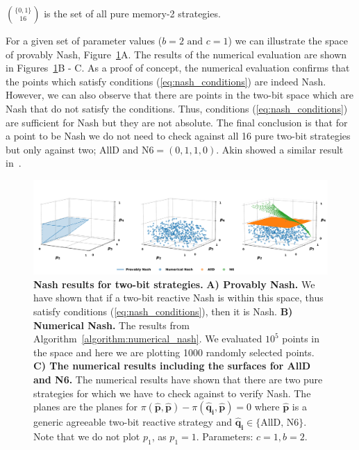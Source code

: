 \documentclass{article}
\theoremstyle{definition}
\begin{document}
\(\binom{\{0, 1\}}{16}\) is the set of all pure memory-2 strategies.

For a given set of parameter values (\(b=2 \text{ and } c=1\)) we can illustrate
the space of provably Nash, Figure~\ref{fig:two_bit_reactive_nash_results}A. The
results of the numerical evaluation are shown in
Figures~\ref{fig:two_bit_reactive_nash_results}B - C. As a proof of concept, the
numerical evaluation confirms that the points which satisfy conditions
(\ref{eq:nash_conditions}) are indeed Nash. However, we can also observe
that there are points in the two-bit space which are Nash that do not satisfy
the conditions. Thus, conditions (\ref{eq:nash_conditions}) are sufficient for
Nash but they are not absolute. The final conclusion is that for a point to be Nash
we do not need to check against all 16 pure two-bit strategies but only against
two; AllD and N6\(=(0, 1, 1, 0)\). Akin showed a similar result
in~\citep{akin:EGADS:2016}.


\begin{figure}[!htbp]
     \centering
     \includegraphics[width=\textwidth]{static/results_two_bit.pdf}
     \caption{\textbf{Nash results for two-bit strategies.}
     \textbf{A) Provably Nash.} We have shown that if a two-bit reactive Nash is
     within this space, thus satisfy conditions (\ref{eq:nash_conditions}), then
     it is Nash. \textbf{B) Numerical Nash.} The results from
     Algorithm~\ref{algorithm:numerical_nash}. We evaluated \(10 ^ 5\) points in
     the space and here we are plotting 1000 randomly selected points. \textbf{C)
     The numerical results including the surfaces for AllD and N6.} The
     numerical results have shown that there are two pure strategies for which
     we have to check against to verify Nash. The planes are the planes for
     \(\pi(\mathbf{\hat{p}}, \mathbf{\hat{p}}) - \pi(\mathbf{\hat{q}_i},
     \mathbf{\hat{p}}) = 0\) where \(\mathbf{\hat{p}}\) is a generic agreeable
     two-bit reactive strategy and \(\mathbf{\hat{q}_i} \in \{\text{AllD, N6}\}\).
     Note that we do
     not plot \(p_1\), as \(p_1=1\). Parameters: \(c=1,
     b=2\).}\label{fig:two_bit_reactive_nash_results}
\end{figure}
\end{document}
